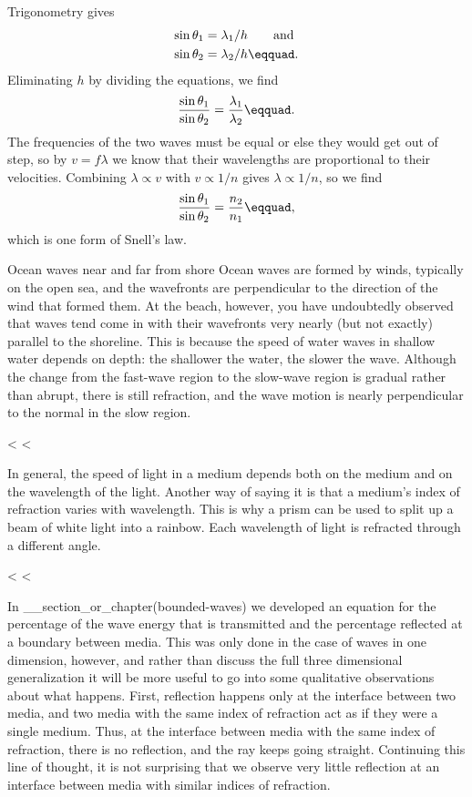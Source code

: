 Trigonometry gives
\begin{align*}
\sin \theta_1 &= \lambda_1/h \qquad  \text{and} \\
\sin \theta_2 &= \lambda_2/h\eqquad.
\end{align*}
Eliminating $h$ by dividing the equations, we find
\begin{equation*}
 \frac{\sin\theta_1}{\sin\theta_2}=\frac{\lambda_1}{\lambda_2}\eqquad.
\end{equation*}
The frequencies of the two waves must be equal or else they
would get out of step, so by $v=f\lambda $ we know that
their wavelengths are proportional to their velocities.
Combining $\lambda\propto v$ with $v\propto 1/n$ gives $\lambda\propto 1/n$, so we find
\begin{equation*}
 \frac{\sin\theta_1}{\sin\theta_2}=\frac{n_2}{n_1}\eqquad,
\end{equation*}
which is one form of Snell's law.

\begin{eg}{Ocean waves near and far from shore}
Ocean waves are formed by winds, typically on the open sea,
and the wavefronts are perpendicular to the direction of the
wind that formed them. At the beach, however, you have
undoubtedly observed that waves tend come in with their
wavefronts very nearly (but not exactly) parallel to the
shoreline. This is because the speed of water waves in
shallow water depends on depth: the shallower the water, the
slower the wave. Although the change from the fast-wave
region to the slow-wave region is gradual rather than
abrupt, there is still refraction, and the wave motion is
nearly perpendicular to the normal in the slow region.
\end{eg}

<%
<%

In general, the speed of light in a medium depends both on
the medium and on the wavelength of the light. Another way
of saying it is that a medium's index of refraction varies
with wavelength. This is why a prism can be used to split up
a beam of white light into a rainbow. Each wavelength of
light is refracted through a different angle.

<%
<%

In __section_or_chapter(bounded-waves) we developed an equation for the percentage of the
wave energy that is transmitted and the percentage reflected
at a boundary between media. This was only done in the case
of waves in one dimension, however, and rather than discuss
the full three dimensional generalization it will be more
useful to go into some qualitative observations about what
happens. First, reflection happens only at the interface
between two media, and two media with the same index of
refraction act as if they were a single medium. Thus, at the
interface between media with the same index of refraction,
there is no reflection, and the ray keeps going straight.
Continuing this line of thought, it is not surprising that
we observe very little reflection at an interface between
media with similar indices of refraction.

